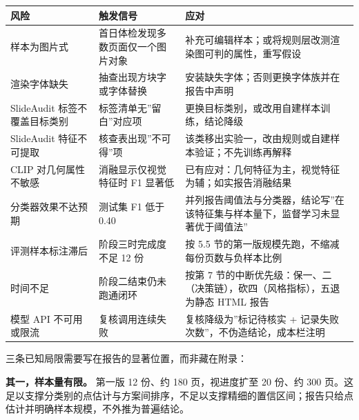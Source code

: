 \documentclass[
  11pt,
]{article}
\newcounter{none} %
\begin{document}
{\def\LTcaptype{none} %
\begin{longtable}[]{@{}
  >{\raggedright\arraybackslash}p{}
  >{\raggedright\arraybackslash}p{}
  >{\raggedright\arraybackslash}p{}@{}}
\toprule\noalign{}
\begin{minipage}[b]{\linewidth}\raggedright
风险
\end{minipage} & \begin{minipage}[b]{\linewidth}\raggedright
触发信号
\end{minipage} & \begin{minipage}[b]{\linewidth}\raggedright
应对
\end{minipage} \\
\midrule\noalign{}
\endhead
\bottomrule\noalign{}
\endlastfoot
样本为图片式 & 首日体检发现多数页面仅一个图片对象 &
补充可编辑样本；或将规则层改测渲染图可判的属性，重写假设 \\
渲染字体缺失 & 抽查出现方块字或字体替换 &
安装缺失字体；否则更换字体族并在报告中声明 \\
SlideAudit 标签不覆盖目标类别 & 标签清单无''留白''对应项 &
更换目标类别，或改用自建样本训练，结论降级 \\
SlideAudit 特征不可提取 & 核查表出现''不可得''项 &
该类移出实验一，改由规则或自建样本验证；不先训练再解释 \\
CLIP 对几何属性不敏感 & 消融显示仅视觉特征时 F1 显著低 &
已有应对：几何特征为主，视觉特征为辅；如实报告消融结果 \\
分类器效果不达预期 & 测试集 F1 低于 0.40 &
并列报告阈值法与分类器，结论写''在该特征集与样本量下，监督学习未显著优于阈值法'' \\
评测样本标注滞后 & 阶段三时完成度不足 12 份 & 按 5.5
节的第一版规模先跑，不缩减每份页数与负样本比例 \\
时间不足 & 阶段二结束仍未跑通闭环 & 按第 7
节的中断优先级：保一、二（决策链），砍四（风格指标），五退为静态 HTML
报告 \\
模型 API 不可用或限流 & 复核调用连续失败 & 复核降级为''标记待核实 +
记录失败次数''，不伪造结论，成本栏注明 \\
\end{longtable}
}

三条已知局限需要写在报告的显著位置，而非藏在附录：

\textbf{其一，样本量有限。} 第一版 12 份、约 180 页，视进度扩至 20
份、约 300
页。这足以支撑分类别的点估计与方案间排序，不足以支撑精细的置信区间；报告只给点估计并明确样本规模，不外推为普遍结论。
\end{document}
